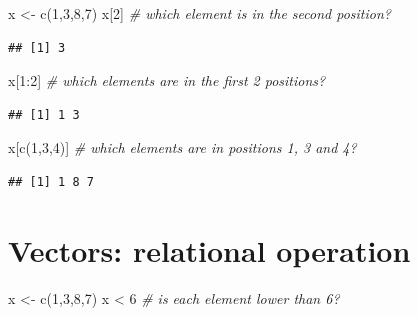 \documentclass[
  11pt,
]{book}
\newenvironment{Shaded}{\begin{snugshade}}{\end{snugshade}}
\newcommand{\CommentTok}[1]{\textcolor[rgb]{0.56,0.35,0.01}{\textit{#1}}}
\newcommand{\DecValTok}[1]{\textcolor[rgb]{0.00,0.00,0.81}{#1}}
\newcommand{\FunctionTok}[1]{\textcolor[rgb]{0.00,0.00,0.00}{#1}}
\newcommand{\NormalTok}[1]{#1}
\newcommand{\OtherTok}[1]{\textcolor[rgb]{0.56,0.35,0.01}{#1}}
\newcommand{\SpecialCharTok}[1]{\textcolor[rgb]{0.00,0.00,0.00}{#1}}
\begin{document}
\begin{Shaded}
\begin{Highlighting}[]
\NormalTok{x }\OtherTok{\textless{}{-}} \FunctionTok{c}\NormalTok{(}\DecValTok{1}\NormalTok{,}\DecValTok{3}\NormalTok{,}\DecValTok{8}\NormalTok{,}\DecValTok{7}\NormalTok{) }
\NormalTok{x[}\DecValTok{2}\NormalTok{] }\CommentTok{\# which element is in the second position?}
\end{Highlighting}
\end{Shaded}

\begin{verbatim}
## [1] 3
\end{verbatim}

\begin{Shaded}
\begin{Highlighting}[]
\NormalTok{x[}\DecValTok{1}\SpecialCharTok{:}\DecValTok{2}\NormalTok{] }\CommentTok{\# which elements are in the first 2 positions?}
\end{Highlighting}
\end{Shaded}

\begin{verbatim}
## [1] 1 3
\end{verbatim}

\begin{Shaded}
\begin{Highlighting}[]
\NormalTok{x[}\FunctionTok{c}\NormalTok{(}\DecValTok{1}\NormalTok{,}\DecValTok{3}\NormalTok{,}\DecValTok{4}\NormalTok{)] }\CommentTok{\# which elements are in positions 1, 3 and 4?}
\end{Highlighting}
\end{Shaded}

\begin{verbatim}
## [1] 1 8 7
\end{verbatim}

\hypertarget{vectors-relational-operation}{%
\section{Vectors: relational operation}\label{vectors-relational-operation}}

\begin{Shaded}
\begin{Highlighting}[]
\NormalTok{x }\OtherTok{\textless{}{-}} \FunctionTok{c}\NormalTok{(}\DecValTok{1}\NormalTok{,}\DecValTok{3}\NormalTok{,}\DecValTok{8}\NormalTok{,}\DecValTok{7}\NormalTok{) }
\NormalTok{x }\SpecialCharTok{\textless{}} \DecValTok{6} \CommentTok{\# is each element lower than 6?}
\end{Highlighting}
\end{Shaded}
\end{document}
